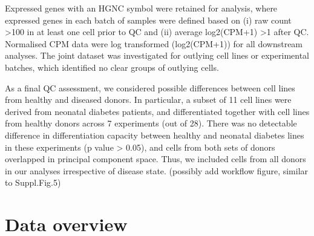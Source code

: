 Expressed genes with an HGNC symbol were retained for analysis, where expressed genes in each batch of samples were defined based on (i) raw count >100 in at least one cell prior to QC and (ii) average log2(CPM+1) >1 after QC. 
Normalised CPM data were log transformed (log2(CPM+1)) for all downstream analyses. 
The joint dataset was investigated for outlying cell lines or experimental batches, which identified no clear groups of outlying cells. 

As a final QC assessment, we considered possible differences between cell lines from healthy and diseased donors. 
In particular, a subset of 11 cell lines were derived from neonatal diabetes patients, and differentiated together with cell lines from healthy donors across 7 experiments (out of 28). 
There was no detectable difference in differentiation capacity between healthy and neonatal diabetes lines in these experiments (p value > 0.05), and cells from both sets of donors overlapped in principal component space. 
Thus, we included cells from all donors in our analyses irrespective of disease state.
(possibly add workflow figure, similar to Suppl.Fig.5)



\section{Data overview}

